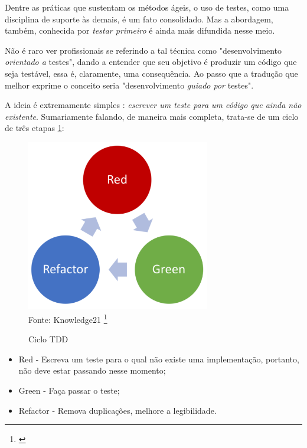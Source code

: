 \documentclass[12pt,a4paper,oneside,english,brazil]{article}
\begin{document}
      Dentre as práticas que sustentam os métodos ágeis, o uso de testes, como
      uma disciplina de suporte às demais, é um fato consolidado. Mas a
      abordagem, também, conhecida por \emph{testar primeiro} é ainda mais
      difundida nesse  meio.

      Não é raro ver profissionais se referindo a tal técnica como
      "desenvolvimento \emph{orientado a} testes", dando a entender que seu
      objetivo é produzir um código que seja testável, essa é, claramente, uma
      consequência. Ao passo que a tradução que melhor exprime o conceito seria
      "desenvolvimento \emph{guiado por} testes".

      A ideia é extremamente simples \cite[p.1]{FreemanPryce2009}: \emph{escrever um
      teste para um código que ainda não existente}. Sumariamente falando, de
      maneira mais completa, trata-se de um ciclo de três etapas
      \ref{fig:ciclotdd}:

      \begin{figure}[htb]
        \centering
        \caption{Ciclo TDD}
        \includegraphics[width=8cm]{ciclo-tdd}
        \label{fig:ciclotdd}
        \\
        Fonte: Knowledge21 \footnote{\cite{Ferreira2018}}
      \end{figure}

      \begin{itemize}
        \item Red - Escreva um teste para o qual não existe uma
          implementação, portanto, não deve estar passando nesse
          momento;
        \item Green - Faça passar o teste;
        \item Refactor - Remova duplicações,  melhore a legibilidade.
      \end{itemize}
\end{document}
